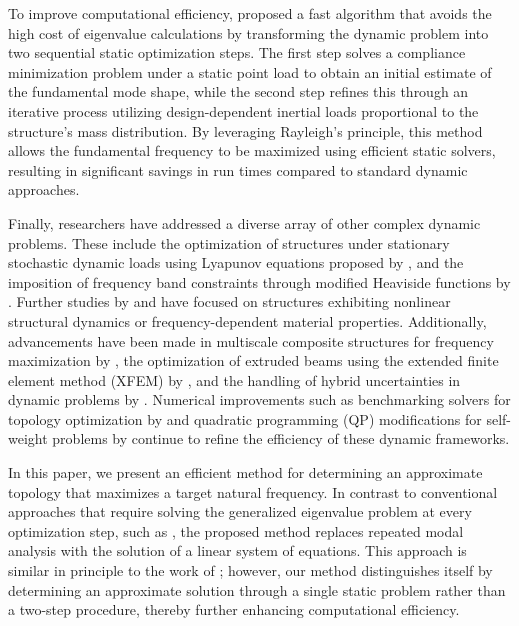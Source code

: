 \documentclass[applsci,article,submit,pdftex,moreauthors]{Definitions/mdpi}
\begin{document}
To improve computational efficiency, \citet{YUKSEL2025} proposed a fast algorithm that avoids the high cost of eigenvalue calculations by transforming the dynamic problem into two sequential static optimization steps. The first step solves a compliance minimization problem under a static point load to obtain an initial estimate of the fundamental mode shape, while the second step refines this through an iterative process utilizing design-dependent inertial loads proportional to the structure's mass distribution. By leveraging Rayleigh’s principle, this method allows the fundamental frequency to be maximized using efficient static solvers, resulting in significant savings in run times compared to standard dynamic approaches.

Finally, researchers have addressed a diverse array of other complex dynamic problems. These include the optimization of structures under stationary stochastic dynamic loads using Lyapunov equations proposed by \citet{GOMEZ2019}, and the imposition of frequency band constraints through modified Heaviside functions by \citet{LI2021}. Further studies by \citet{WU2024} and \citet{POZZI2025} have focused on structures exhibiting nonlinear structural dynamics or frequency-dependent material properties. Additionally, advancements have been made in multiscale composite structures for frequency maximization by \citet{LEE2024}, the optimization of extruded beams using the extended finite element method (XFEM) by \citet{MARZOK2024}, and the handling of hybrid uncertainties in dynamic problems by \citet{WU2022}. Numerical improvements such as benchmarking solvers for topology optimization by \citet{ROJASLABANDA2015} and quadratic programming (QP) modifications for self-weight problems by \citet{MUNRO2024} continue to refine the efficiency of these dynamic frameworks.

In this paper, we present an efficient method for determining an approximate topology that maximizes a target natural frequency. In contrast to conventional approaches that require solving the generalized eigenvalue problem at every optimization step, such as \citet{DU2007}, the proposed method replaces repeated modal analysis with the solution of a linear system of equations. This approach is similar in principle to the work of \citet{YUKSEL2025}; however, our method distinguishes itself by determining an approximate solution through a single static problem rather than a two-step procedure, thereby further enhancing computational efficiency.
\end{document}
